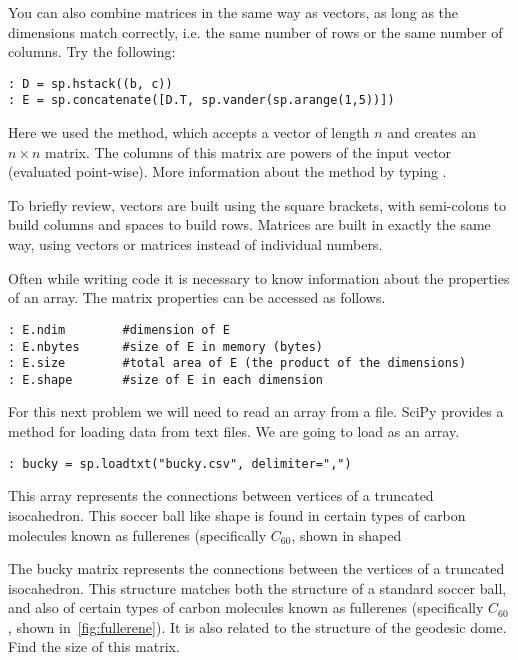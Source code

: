 You can also combine matrices in the same way as vectors, as long as the
dimensions match correctly, i.e. the same number of rows or the same number of
columns. Try the following:

\begin{lstlisting}
: D = sp.hstack((b, c))
: E = sp.concatenate([D.T, sp.vander(sp.arange(1,5))])
\end{lstlisting}

Here we used the  method, which accepts a vector of length $n$ and
creates an $n \times n$ matrix. The columns of this matrix are powers of the
input vector (evaluated point-wise). More information about the 
method by typing .

To briefly review, vectors are built using the square brackets, with semi-colons
to build columns and spaces to build rows. Matrices are built in exactly the
same way, using vectors or matrices instead of individual numbers.

Often while writing code it is necessary to know information about the
properties of an array.  The matrix properties can be accessed as follows.

\begin{lstlisting}
: E.ndim        #dimension of E
: E.nbytes      #size of E in memory (bytes)
: E.size        #total area of E (the product of the dimensions)
: E.shape       #size of E in each dimension
\end{lstlisting}

For this next problem we will need to read an array from a file.  SciPy provides
a method for loading data from text files.  We are going to load 
as an array.
\begin{lstlisting}
: bucky = sp.loadtxt("bucky.csv", delimiter=",")
\end{lstlisting}

This array represents the connections between vertices of a truncated
isocahedron.  This soccer ball like shape is found in certain types of carbon
molecules known as fullerenes (specifically $C_{60}$, shown in shaped 
 
\begin{problem}
The bucky matrix represents the connections
between the vertices of a truncated isocahedron. This structure matches both the
structure of a standard soccer ball, and also of certain types of carbon
molecules known as fullerenes (specifically $C_{60}$, shown
in~\ref{fig:fullerene}). It is also related to the structure of the geodesic
dome. Find the size of this matrix.
\end{problem}

